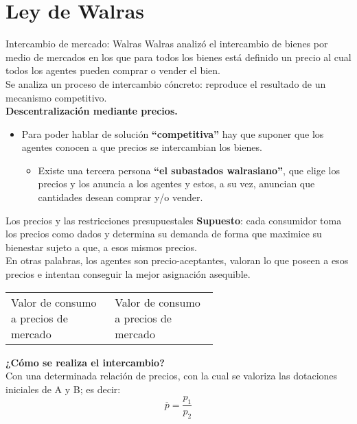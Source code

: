 \section[Walras]{Ley de Walras}

\begin{frame}{Intercambio de mercado: Walras}
	Walras analizó el intercambio de bienes por medio de mercados en los que para todos los bienes está definido un precio al cual todos los agentes pueden comprar o vender el bien. \\
		\medskip
	Se analiza un proceso de intercambio cóncreto: reproduce el resultado de un mecanismo competitivo. \\
		\medskip
	\textbf{Descentralización mediante precios.}
		\begin{itemize}
			\item Para poder hablar de solución \textbf{``competitiva''} hay que suponer que los agentes conocen a que precios se intercambian los bienes.
				\begin{itemize}
					\item Existe una tercera persona \textbf{``el subastados walrasiano''}, que elige los precios y los anuncia a los agentes y estos, a su vez, anuncian que cantidades desean comprar y/o vender.
				\end{itemize}
		\end{itemize}
\end{frame}
\begin{frame}{Los precios y las restricciones presupuestales}
	\textbf{Supuesto}: cada consumidor toma los precios como dados y determina su demanda de forma que maximice su bienestar sujeto a que, a esos mismos precios.\\
		\medskip
	En otras palabras, los agentes son precio-aceptantes, valoran lo que poseen a esos precios e intentan conseguir la mejor asignación asequible.\\
		\medskip
	\begin{table}[htb]
		\centering
			\begin{tabular}{m{0.3\linewidth}@{\quad $\leq$ \quad}m{0.3\linewidth}}
				Valor de consumo a precios de mercado & Valor de consumo a precios de mercado
			\end{tabular}
	\end{table}
		\medskip
	\textbf{¿Cómo se realiza el intercambio?}\\
	Con una determinada relación de precios, con la cual se valoriza las dotaciones iniciales de A y B; es decir:
		$$\overline{p} = \frac{p_1}{p_2}$$
\end{frame}
